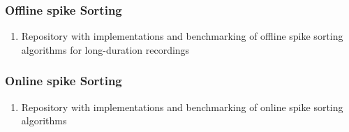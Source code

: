 \subsubsection{Offline spike Sorting}
\label{sec:offlineSpikeSorting}


\begin{enumerate}

    \item Repository with implementations and benchmarking of offline spike
        sorting algorithms for long-duration recordings

\end{enumerate}

\subsubsection{Online spike Sorting}
\label{sec:onlineSpikeSorting}


\begin{enumerate}

    \item Repository with implementations and benchmarking of online spike
        sorting algorithms

\end{enumerate}

